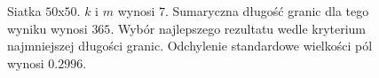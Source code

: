\begin{figure}[h]
\begin{subfigure}{.33\textwidth}
    \caption[short]{}
\end{subfigure}
\caption{Siatka $50$x$50$. $k$ i $m$ wynosi $7$.
Sumaryczna długość granic dla tego wyniku wynosi $365$.
Wybór najlepszego rezultatu wedle kryterium najmniejszej długości granic.
Odchylenie standardowe wielkości pól wynosi $0.2996$.}
\label{result:m:2}
\end{figure}
\begin{figure}[h]
\centering
\begin{subfigure}{.33\textwidth}
    \centering
    \caption[short]{}
\end{subfigure}%
\begin{subfigure}{.33\textwidth}
    \centering
    \caption[short]{}

\end{subfigure}
\end{figure}

